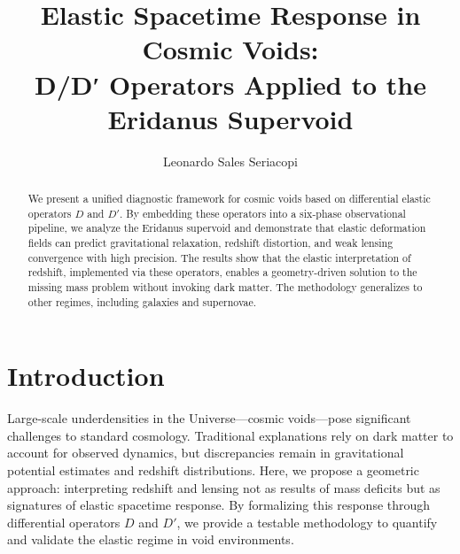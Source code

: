 \documentclass[twocolumn]{aastex631}
\begin{document}
\title{Elastic Spacetime Response in Cosmic Voids:\\ D/D′ Operators Applied to the Eridanus Supervoid}

\author{Leonardo Sales Seriacopi}


\begin{abstract}
We present a unified diagnostic framework for cosmic voids based on differential elastic operators $D$ and $D'$. By embedding these operators into a six-phase observational pipeline, we analyze the Eridanus supervoid and demonstrate that elastic deformation fields can predict gravitational relaxation, redshift distortion, and weak lensing convergence with high precision. The results show that the elastic interpretation of redshift, implemented via these operators, enables a geometry-driven solution to the missing mass problem without invoking dark matter. The methodology generalizes to other regimes, including galaxies and supernovae.
\end{abstract}


\section{Introduction}
Large-scale underdensities in the Universe—cosmic voids—pose significant challenges to standard cosmology. Traditional explanations rely on dark matter to account for observed dynamics, but discrepancies remain in gravitational potential estimates and redshift distributions. Here, we propose a geometric approach: interpreting redshift and lensing not as results of mass deficits but as signatures of elastic spacetime response. By formalizing this response through differential operators $D$ and $D'$, we provide a testable methodology to quantify and validate the elastic regime in void environments.
\end{document}
